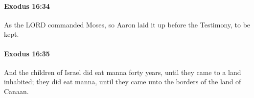 		\paragraph{Exodus 16:34} %
			\label{EXODUS-16-34}

			As the LORD commanded Moses, so Aaron laid it up before the Testimony, to be kept.


		\paragraph{Exodus 16:35} %
			\label{EXODUS-16-35}

			And the children of Israel did eat manna forty years, until they came to a land inhabited; they did eat manna, until they came unto the borders of the land of Canaan.


